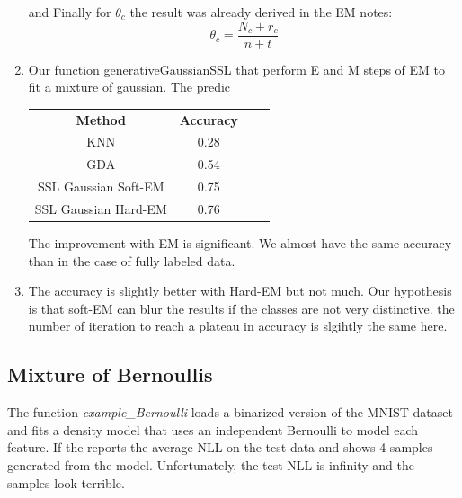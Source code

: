 \documentclass{article}
\begin{document}
\begin{enumerate}
  and Finally for $\theta_c$ the result was already derived in the EM notes:
  \[
 \theta_c = \frac{N_c+r_c}{n+t}
  \]

 \item
 Our function generativeGaussianSSL that perform E and M steps of EM to fit a mixture of gaussian. The predic 
  
  
  \begin{tabular}[h]{cccc}
  \textbf{Method} & \textbf{Accuracy}\\
  KNN & 0.28\\
  GDA & 0.54\\
  SSL Gaussian Soft-EM & 0.75 \\
  SSL Gaussian Hard-EM & 0.76 
\end{tabular}
 
 The improvement with EM is significant. We almost have the same accuracy than in the case of fully labeled data.
 \item
  The accuracy is slightly better with Hard-EM but not much. Our hypothesis is that soft-EM can blur the results if the classes are not very distinctive. the number of iteration to reach a plateau in accuracy is slgihtly the same here. 
  

\end{enumerate}

\subsection{Mixture of Bernoullis}

The function \emph{example\_Bernoulli} loads a binarized version of the MNIST dataset and fits a density model that uses an independent Bernoulli to model each feature. If the reports the average NLL on the test data and shows 4 samples generated from the model. Unfortunately, the test NLL is infinity and the samples look terrible.
\end{document}

